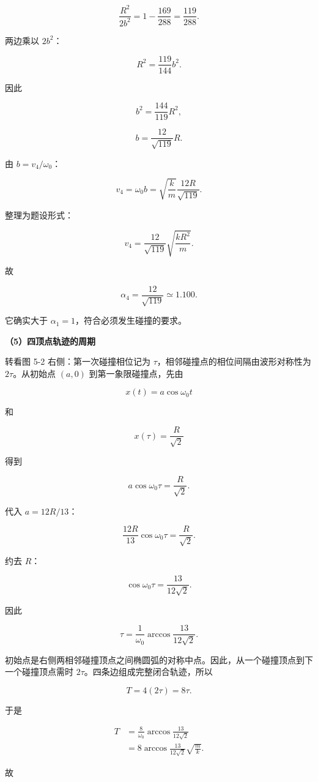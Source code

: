 \documentclass[12pt,a4paper,UTF8]{ctexart}
\begin{document}
\[
\frac{R^2}{2b^2}=1-\frac{169}{288}=\frac{119}{288}.
\]

两边乘以 \(2b^2\)：

\[
R^2=\frac{119}{144}b^2.
\]

因此

\[
b^2=\frac{144}{119}R^2,
\]

\[
\boxed{b=\frac{12}{\sqrt{119}}R}.
\]

由 \(b=v_4/\omega_0\)：

\[
v_4=\omega_0b
=\sqrt{\frac{k}{m}}\frac{12R}{\sqrt{119}}.
\]

整理为题设形式：

\[
\boxed{
v_4=\frac{12}{\sqrt{119}}\sqrt{\frac{kR^2}{m}}
}.
\]

故

\[
\boxed{\alpha_4=\frac{12}{\sqrt{119}}\simeq1.100}.
\]

它确实大于 \(\alpha_1=1\)，符合必须发生碰撞的要求。

\textbf{（5）四顶点轨迹的周期}

转看图 5-2 右侧：第一次碰撞相位记为
\(\tau\)，相邻碰撞点的相位间隔由波形对称性为 \(2\tau\)。从初始点
\((a,0)\) 到第一象限碰撞点，先由

\[x(t)=a\cos\omega_0t\]

和

\[x(\tau)=\frac{R}{\sqrt2}\]

得到

\[
a\cos\omega_0\tau=\frac{R}{\sqrt2}.
\]

代入 \(a=12R/13\)：

\[
\frac{12R}{13}\cos\omega_0\tau=\frac{R}{\sqrt2}.
\]

约去 \(R\)：

\[
\cos\omega_0\tau=\frac{13}{12\sqrt2}.
\]

因此

\[
\boxed{
\tau=\frac1{\omega_0}\arccos\frac{13}{12\sqrt2}
}.
\]

初始点是右侧两相邻碰撞顶点之间椭圆弧的对称中点。因此，从一个碰撞顶点到下一个碰撞顶点需时
\(2\tau\)。四条边组成完整闭合轨迹，所以

\[
T=4(2\tau)=8\tau.
\]

于是

\[
\begin{aligned}
T
&=\frac8{\omega_0}\arccos\frac{13}{12\sqrt2}\\
&=8\arccos\frac{13}{12\sqrt2}\sqrt{\frac{m}{k}}.
\end{aligned}
\]

故
\end{document}
